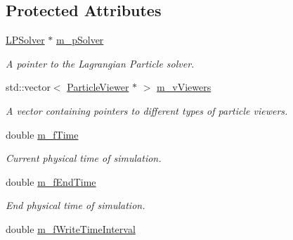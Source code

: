 \subsection*{Protected Attributes}
\begin{DoxyCompactItemize}
\item 
\hypertarget{classTimeController_a4a917d4256a1c17d73ed99fada14d9b0}{\hyperlink{classLPSolver}{L\-P\-Solver} $\ast$ \hyperlink{classTimeController_a4a917d4256a1c17d73ed99fada14d9b0}{m\-\_\-p\-Solver}}\label{classTimeController_a4a917d4256a1c17d73ed99fada14d9b0}

\begin{DoxyCompactList}\small\item\em A pointer to the Lagrangian Particle solver. \end{DoxyCompactList}\item 
\hypertarget{classTimeController_a5da55d4137081d3a8eb0aa291859574f}{std\-::vector$<$ \hyperlink{classParticleViewer}{Particle\-Viewer} $\ast$ $>$ \hyperlink{classTimeController_a5da55d4137081d3a8eb0aa291859574f}{m\-\_\-v\-Viewers}}\label{classTimeController_a5da55d4137081d3a8eb0aa291859574f}

\begin{DoxyCompactList}\small\item\em A vector containing pointers to different types of particle viewers. \end{DoxyCompactList}\item 
\hypertarget{classTimeController_a62ad85a4f20827517639b6cadc7bf7ad}{double \hyperlink{classTimeController_a62ad85a4f20827517639b6cadc7bf7ad}{m\-\_\-f\-Time}}\label{classTimeController_a62ad85a4f20827517639b6cadc7bf7ad}

\begin{DoxyCompactList}\small\item\em Current physical time of simulation. \end{DoxyCompactList}\item 
\hypertarget{classTimeController_a17f379516b20b762851426183c58ea1e}{double \hyperlink{classTimeController_a17f379516b20b762851426183c58ea1e}{m\-\_\-f\-End\-Time}}\label{classTimeController_a17f379516b20b762851426183c58ea1e}

\begin{DoxyCompactList}\small\item\em End physical time of simulation. \end{DoxyCompactList}\item 
\hypertarget{classTimeController_afa7ed4273d825146845a64260eef4c3c}{double \hyperlink{classTimeController_afa7ed4273d825146845a64260eef4c3c}{m\-\_\-f\-Write\-Time\-Interval}}\label{classTimeController_afa7ed4273d825146845a64260eef4c3c}


\end{DoxyCompactItemize}
